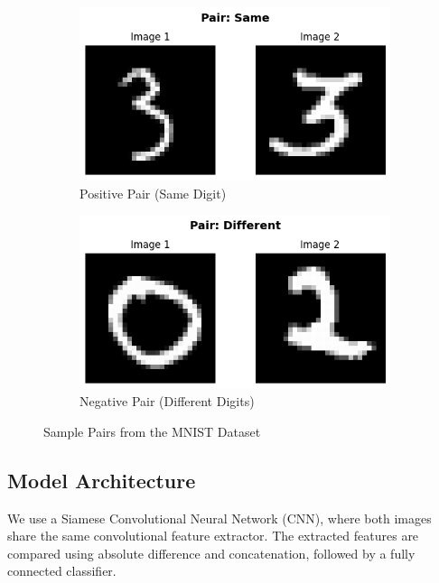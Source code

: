 \documentclass{article}
\begin{document}
\begin{figure}
  \centering
  \begin{subfigure}{0.45\textwidth}
    \includegraphics[width=\textwidth]{images/q2_pair_sample_1.png}
    \caption{Positive Pair (Same Digit)}
  \end{subfigure}
  \hspace{0.5cm}
  \begin{subfigure}{0.45\textwidth}
    \includegraphics[width=\textwidth]{images/q2_pair_sample.png}
    \caption{Negative Pair (Different Digits)}
  \end{subfigure}
  \caption{Sample Pairs from the MNIST Dataset}
  \label{fig:mnist_pairs}
\end{figure}

\subsection*{Model Architecture}
We use a Siamese Convolutional Neural Network (CNN), where both images share the same convolutional feature extractor. The extracted features are compared using absolute difference and concatenation, followed by a fully connected classifier.
\end{document}
